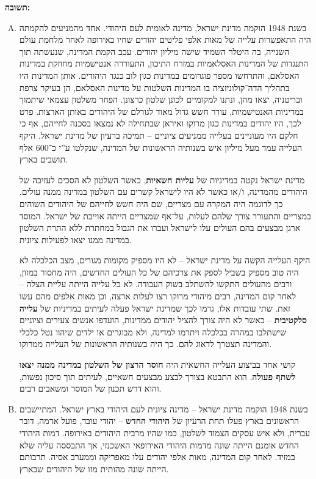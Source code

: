 \documentclass[]{../../../../tex/classes/styledArticle}
\begin{document}
	\textbf{תשובה: }
	\begin{enumerate}[A.]
		\item 
		בשנת 1948 הוקמה מדינת ישראל, מדינה לאומית לעם היהודי. אחד מהמניעים להקמתה היה התאפשרות עלייה של מאות אלפי פליטים יהודים שחיו באירופה לאחר מלחמת עולם השנייה, בה היטלר השמיד שישה מיליון יהודים. עכב הקמת המדינה, שנעשתה תוך התנגדות של המדינות האסלאמיות במזרח התיכון, התעוררה אנטישמיות מחוזקת במדינות האסלאם, והתרחשו מספר פוגרומים במדינות כגון לוב כנגד היהודים. אותן המדינות היו בתהליך הדה־קולוניזציה בו המדינות השלטות על מדינות האסלאם, הן בעיקר צרפת ובריטניה, יצאו מהן, ונתנו למקומיים לכונן שלטון כרצונן. הפחד משלטון עצמאי שיתמוך במדיניות האנטישמיות, עורר חשש גדול מאוד לגורלם של היהודים באותן הארצות. פרט לכך, היו יהודים במדינות כגון מרוקו ואיראן שבתחילה לא נמצאו בסכנה לחייהם, אף כי חלקם היו מעוניינים בעלייה ממניעים ציוניים – תמיכה ברעיון של מדינת ישראל. היקף העלייה עמד מעל מיליון איש בשנותיה הראשונות של המדינה, שנקלטו ע''י כ־600 אלף תושבים בארץ. 
		
		מדינת ישראל נקטה במדיניות של \textbf{עליות חשאיות}, כאשר השלטון לא הסכים לעזיבה של היהודים מהמדינה, ו/או כאשר לא היו לישראל קשרים עם השלטון במדינה ממנה עולים. כך לדוגמה היה המקרה עם מצריים, שם היה חשש לחייהם של היהודים השוהים במצריים והתעורר צורך שלהם לעלות, על־אף שמצריים הייתה אוייבת של ישראל. המוסד ארגן מבצעים בהם העולים עלו לישראל ועברו את הגבול במחתרת ללא התרת השלטון במדינה ממנו יצאו לפעילות ציונית. 
		
		היקף העלייה הקשה על מדינת ישראל – לא היו מספיק מקומות מגורים, מצב הכלכלה לא היה טוב מספיק בשביל לספק את צרכיהם של כל העולים החדשים, היה מחסור במזון, ורבים מהעולים התקשו להשתלב בשוק העבודה. לא כל עלייה הייתה עליית הצלה – לאחר קום המדינה, רבים מיהודי מרוקו רצו לעלות ארצה, וכן מאות אלפים מהם עשו זאת. שתי עובדות אלו, גרמו לכך שמדינת ישראל פעלה לעיתים במדיניות של \textbf{עלייה סלקטיבית} – כאשר לא היה צורך להציל יהודים ממדינות, הועדפו אנשים צעירים וציוניים שישתלבו במהרה בכלכלה ויתרמו למדינה, ולא מבוגרים או ילדים שיהוו נטל כלכלי והמדינה תצטרך לדאוג להם. כך היה בשנותיה הראשונות של העלייה ממרוקו. 
		
		קושי אחד בביצוע העלייה החשאית היה \textbf{חוסר הרצון של השלטון במדינה ממנה יצאו לשתף פעולה}. הוא התבטא בצורך לבצע מבצעים חשאיים, לעיתים תוך סיכון נפשות, והוא דרש תכנון של המוסד ומשאבים רבים. 
		
		\item 
		בשנת 1948 הוקמה מדינת ישראל – מדינה ציונית לעם היהודי בארץ ישראל. המתיישבים הראשונים בארץ פעלו תחת הרעיון של \textbf{היהודי החדש} – יהודי עובד, פועל אדמה, דובר עברית, ולא איש עסקים הצמוד לשלטון, כמו שהיו מרבית היהודים באירופה. דמות היהודי החדש אומנם הייתה שונה מדמות היהודי האירופאי האשכנזי, אך התבססה עליה שלא במזיד. לאחר קום המדינה, מאות אלפי יהודים עלו מאפריקה וממערב אסיה. תרבותם הייתה שונה מהותית מזו של היהודים שבארץ. 
		

\end{enumerate}
\end{document}
